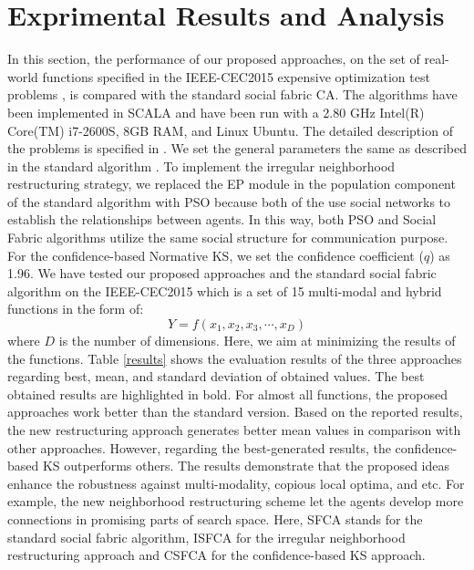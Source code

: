 \documentclass[letterpaper]{article}
\begin{document}
\section{Exprimental Results and Analysis}
In this section, the performance of our proposed approaches, on the set of real-world functions specified in the IEEE-CEC2015 expensive optimization test problems \cite{chen2014problem}, is compared with the standard social fabric CA. The algorithms have been implemented in SCALA and have been run with a 2.80 GHz Intel(R) Core(TM) i7-2600S, 8GB RAM, and Linux Ubuntu. The detailed description of the problems is specified in \cite{chen2014problem}. \newline
We set the general parameters the same as described in the standard algorithm \cite{ali2016leveraged}. To implement the irregular neighborhood restructuring strategy, we replaced the EP module in the population component of the standard algorithm with PSO because both of the use social networks to establish the relationships between agents. In this way, both PSO and Social Fabric algorithms utilize the same social structure for communication purpose. For the confidence-based Normative KS, we set the confidence coefficient ($q$) as 1.96.\newline
We have tested our proposed approaches and the standard social fabric algorithm on the IEEE-CEC2015 which is a set of 15 multi-modal and hybrid functions in the form of: 
\begin{equation}
	Y=f(x_{1}, x_{2}, x_{3}, \cdots, x_{D})
\end{equation}
where $D$ is the number of dimensions. Here, we aim at minimizing the results of the functions.\newline
Table \ref{results} shows the evaluation results of the three approaches regarding best, mean, and standard deviation of obtained values. The best obtained results are highlighted in bold. For almost all functions, the proposed approaches work better than the standard version. Based on the reported results, the new restructuring approach generates better mean values in comparison with other approaches. However, regarding the best-generated results, the confidence-based KS outperforms others. The results demonstrate that the proposed ideas enhance the robustness against multi-modality, copious local optima, and etc. For example, the new neighborhood restructuring scheme let the agents develop more connections in promising parts of search space. Here, SFCA stands for the standard social fabric algorithm, ISFCA for the irregular neighborhood restructuring approach and CSFCA for the confidence-based KS approach.
\end{document}
